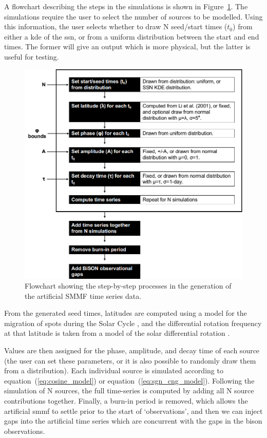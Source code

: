 A flowchart describing the steps in the simulations is shown in Figure~\ref{fig:flowchart}. The simulations require the user to select the number of sources to be modelled. Using this information, the user selects whether to draw N seed/start times ($t_0$) from either a \gls{kde} of the \gls{ssn}, or from a uniform distribution between the start and end times. The former will give an output which is more physical, but the latter is useful for testing.


\begin{figure}[ht!]
	\centering
	\includegraphics[width=0.85\columnwidth]{flow_chart_2.png}
	\caption{Flowchart showing the step-by-step processes in the generation of the artificial SMMF time series data.}
	\label{fig:flowchart}
\end{figure}


From the generated seed times, latitudes are computed using a model for the migration of spots during the Solar Cycle \citep{li_latitude_2001}, and the differential rotation frequency at that latitude is taken from a model of the solar differential rotation \citep{snodgrass_magnetic_1983}. 

Values are then assigned for the phase, amplitude, and decay time of each source (the user can set these parameters, or it is also possible to randomly draw them from a distribution). Each individual source is simulated according to equation~(\ref{eq:cosine_model}) or equation~(\ref{eq:sgn_cng_model}). Following the simulation of N sources, the full time-series is computed by adding all N source contributions together. Finally, a burn-in period is removed, which allows the artificial \gls{smmf} to settle prior to the start of `observations', and then we can inject gaps into the artificial time series which are concurrent with the gaps in the \gls{bison} observations.

